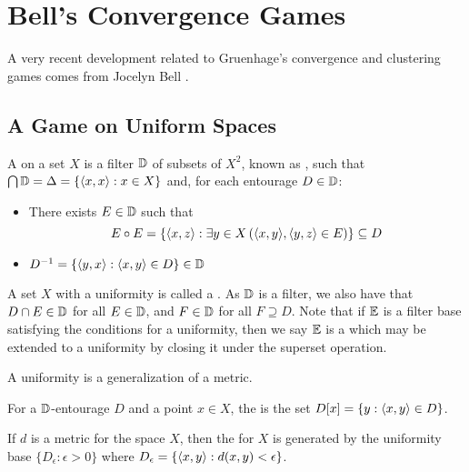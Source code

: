 
\chapter{Bell's Convergence Games}

A very recent development related to Gruenhage's convergence and
clustering games comes from
Jocelyn Bell \cite{MR3239205}.



\section{A Game on Uniform Spaces}

\begin{defn}
  A  on a set $X$ is a filter $\mathbb{D}$ of subsets of $X^2$,
  known as , such that
  $\bigcap\mathbb{D}=\Delta=\{\langle x,x\rangle:x\in X\}$ and, for each entourage $D\in\mathbb{D}$:
  \begin{itemize}
    \item There exists ${E}\in\mathbb{D}$ such that
      \[
        {E}\circ{E}
          =
        \left\{\langle x,z\rangle:\exists y\in X\left(\langle x,y\rangle,\langle y,z\rangle\in{E}\right)\right\}
          \subseteq
        D
      \]
    \item $D^{-1}=\{\langle y,x\rangle:\langle x,y\rangle\in D\}\in \mathbb{D}$
  \end{itemize}
\end{defn}

A set $X$ with a uniformity is called a .
As $\mathbb{D}$ is a filter, we also have that $D\cap E\in \mathbb{D}$ for all
$E\in\mathbb{D}$, and $F\in \mathbb{D}$ for all $F\supseteq D$. Note that if $\mathbb{E}$ is
a filter base satisfying the conditions for a uniformity, then we say
$\mathbb{E}$ is a  which may be extended to a uniformity by
closing it under the superset operation.

A uniformity is a generalization of a metric.

\begin{defn}
  For a $\mathbb{D}$-entourage $D$ and a point $x\in X$, the
   is the set $D[x]=\{y:\langle x,y\rangle\in D\}$.
\end{defn}

\begin{defn}
  If $d$ is a metric for the space $X$, then the  for
  $X$ is generated by the uniformity base $\{D_\epsilon:\epsilon>0\}$
  where $D_\epsilon = \{\langle x,y\rangle:d(x,y)<\epsilon\}$.
\end{defn}


